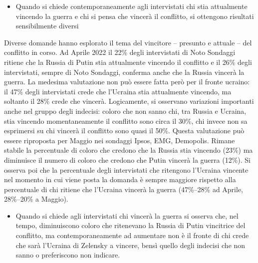 \documentclass[
]{book}
\providecommand{\tightlist}{%
  \setlength{\itemsep}{0pt}\setlength{\parskip}{0pt}}
\begin{document}
\begin{itemize}
\tightlist
\item
  Quando si chiede contemporaneamente agli intervistati chi stia attualmente vincendo la guerra e chi si pensa che vincerà il conflitto, si ottengono risultati sensibilmente diversi
\end{itemize}

Diverse domande hanno esplorato il tema del vincitore -- presunto e attuale -- del conflitto in corso. Ad Aprile 2022 il 22\% degli intervistati di Noto Sondaggi ritiene che la Russia di Putin stia attualmente vincendo il conflitto e il 26\% degli intervistati, sempre di Noto Sondaggi, conferma anche che la Russia vincerà la guerra. La medesima valutazione non può essere fatta però per il fronte ucraino: il 47\% degli intervistati crede che l'Ucraina stia attualmente vincendo, ma soltanto il 28\% crede che vincerà. Logicamente, si osservano variazioni importanti anche nel gruppo degli indecisi: coloro che non sanno chi, tra Russia e Ucraina, stia vincendo momentaneamente il conflitto sono circa il 30\%, chi invece non sa esprimersi su chi vincerà il conflitto sono quasi il 50\%.
Questa valutazione può essere riproposta per Maggio nei sondaggi Ipsos, EMG, Demopolis. Rimane stabile la percentuale di coloro che credono che la Russia stia vincendo (23\%) ma diminuisce il numero di coloro che credono che Putin vincerà la guerra (12\%). Si osserva poi che la percentuale degli intervistati che ritengono l'Ucraina vincente nel momento in cui viene posta la domanda è sempre maggiore rispetto alla percentuale di chi ritiene che l'Ucraina vincerà la guerra (47\%--28\% ad Aprile, 28\%--20\% a Maggio).

\begin{itemize}
\tightlist
\item
  Quando si chiede agli intervistati chi vincerà la guerra si osserva che, nel tempo, diminuiscono coloro che ritenevano la Russia di Putin vincitrice del conflitto, ma contemporaneamente ad aumentare non è il fronte di chi crede che sarà l'Ucraina di Zelensky a vincere, bensì quello degli indecisi che non sanno o preferiscono non indicare.
\end{itemize}
\end{document}
